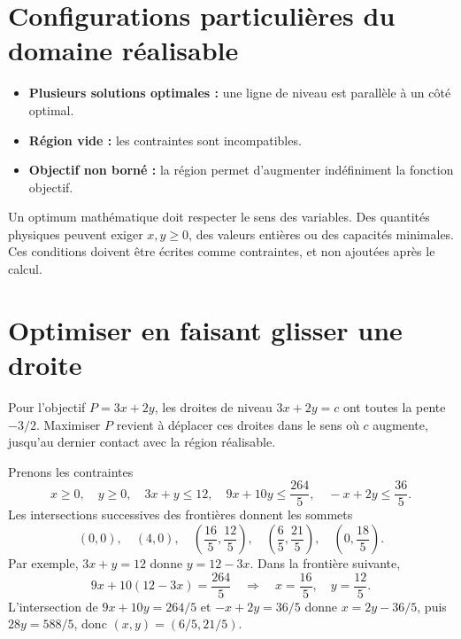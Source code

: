 \section{Configurations particulières du domaine réalisable}
\label{manual:section:13.04}

\begin{itemize}
\item \textbf{Plusieurs solutions optimales :} une ligne de niveau est parallèle à un côté optimal.
\item \textbf{Région vide :} les contraintes sont incompatibles.
\item \textbf{Objectif non borné :} la région permet d'augmenter indéfiniment la fonction objectif.
\end{itemize}

\begin{warningbox}
Un optimum mathématique doit respecter le sens des variables. Des quantités physiques peuvent exiger $x,y\ge0$, des valeurs entières ou des capacités minimales. Ces conditions doivent être écrites comme contraintes, et non ajoutées après le calcul.
\end{warningbox}


\section{Optimiser en faisant glisser une droite}
\label{manual:section:13.05}

\begin{visualbox}
Pour l'objectif $P=3x+2y$, les droites de niveau $3x+2y=c$ ont toutes la pente $-3/2$. Maximiser $P$ revient à déplacer ces droites dans le sens où $c$ augmente, jusqu'au dernier contact avec la région réalisable.
\end{visualbox}

Prenons les contraintes
\[
x\ge0,\quad y\ge0,\quad 3x+y\le12,\quad
9x+10y\le\frac{264}{5},\quad -x+2y\le\frac{36}{5}.
\]
Les intersections successives des frontières donnent les sommets
\[
(0,0),\quad(4,0),\quad
\left(\frac{16}{5},\frac{12}{5}\right),\quad
\left(\frac65,\frac{21}{5}\right),\quad
\left(0,\frac{18}{5}\right).
\]
Par exemple, $3x+y=12$ donne $y=12-3x$. Dans la frontière suivante,
\[
9x+10(12-3x)=\frac{264}{5}
\quad\Longrightarrow\quad x=\frac{16}{5},\quad y=\frac{12}{5}.
\]
L'intersection de $9x+10y=264/5$ et $-x+2y=36/5$ donne
$x=2y-36/5$, puis $28y=588/5$, donc $(x,y)=(6/5,21/5)$.

